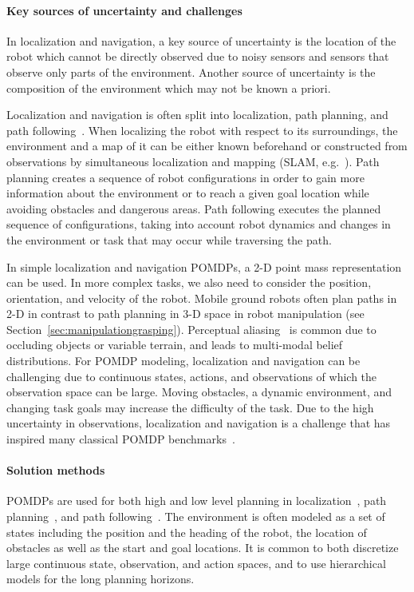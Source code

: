 \documentclass[journal]{IEEEtran}
\begin{document}
\paragraph{Key sources of uncertainty and challenges}
In localization and navigation, a key source of uncertainty is the
location of the robot which cannot be directly observed due to noisy
sensors and sensors that observe only parts of the
environment. Another source of uncertainty is the composition of the
environment which may not be known a priori.

Localization and navigation is often split into localization, path
planning, and path following~\cite{koenig1998xavier}. When localizing
the robot with respect to its surroundings, the environment and a map
of it can be either known beforehand or constructed from observations
by simultaneous localization and mapping (SLAM,
e.g.~\cite{durrantwhyte2006slam}). Path planning creates a sequence of
robot configurations in order to gain more information about the
environment or to reach a given goal location while avoiding obstacles
and dangerous areas. Path following executes the planned sequence of
configurations, taking into account robot dynamics and changes in the
environment or task that may occur while traversing the path.

In simple localization and navigation POMDPs, a 2-D point mass
representation can be used.
{In more complex tasks, we also need to consider the position,
orientation, and velocity of the robot.}
{Mobile
ground robots often plan paths in 2-D in contrast} to
path planning in 3-D space in robot manipulation (see
Section~\ref{sec:manipulationgrasping}).
Perceptual aliasing~\cite{filliat2003map} is common due to occluding objects or variable terrain, and leads to multi-modal belief
distributions. For POMDP modeling, localization and navigation can be
challenging due to continuous states, actions, and observations of
which the observation space can be large. Moving obstacles, a dynamic
environment, and changing task goals may increase the difficulty of
the task. Due to the high uncertainty in observations, localization and
navigation is a challenge that has inspired many
classical POMDP benchmarks~\cite{littman1995learning}.

\paragraph{Solution methods}

POMDPs {are} used for both high and low level planning in
localization~\cite{koenig1998xavier}, path
planning~\cite{koenig1998xavier}, and path
following~\cite{agha2014health}.
The environment is often modeled as a set of states including the
position and the heading of the robot, the location of obstacles as
well as the start and goal locations. {It is common to both
discretize large continuous state, observation, and action
spaces, and to use hierarchical models for the long planning
horizons.}
\end{document}
